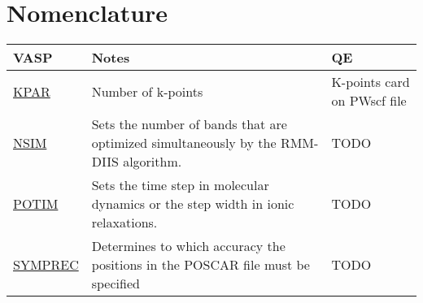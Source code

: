 \documentclass[12pt]{article}
\begin{document}
\section*{Nomenclature}
\begin{center}
\begin{table}[ht]
\begin{tabularx}{\linewidth}{|>{\RaggedRight}p{2.5cm}|x|x|}\hline
 VASP  & Notes & QE \\ \hline
 
 
 \href{https://www.vasp.at/wiki/index.php/KPAR}{KPAR} &
 Number of k-points &
K-points card on PWscf file \\ \hline

 \href{https://www.vasp.at/wiki/index.php/NSIM}{NSIM} &
 Sets the number of bands that are optimized simultaneously by the RMM-DIIS algorithm. &
 TODO \\ \hline
 
 \href{https://www.vasp.at/wiki/index.php/POTIM}{POTIM} &
 Sets the time step in molecular dynamics or the step width in ionic relaxations. &
 TODO \\ \hline
 
 \href{https://www.vasp.at/wiki/index.php/SYMPREC}{SYMPREC} &
 Determines to which accuracy the positions in the POSCAR file must be specified &
 TODO \\ \hline
\end{tabularx}
\end{table}
\end{center}
\end{document}
